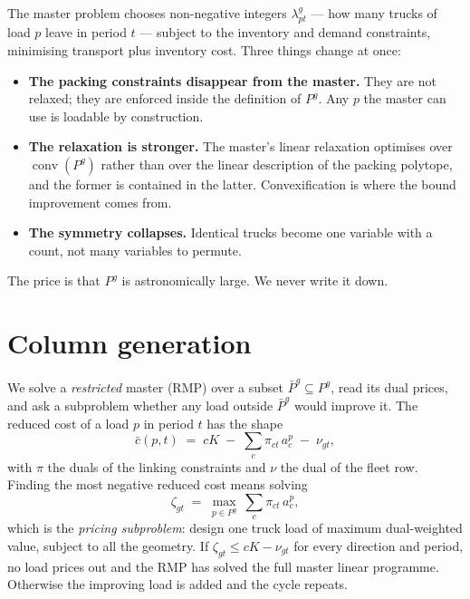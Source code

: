 \documentclass[11pt,a4paper]{article}
\newcommand{\conv}{\operatorname{conv}}
\begin{document}
The master problem chooses non-negative integers $\lambda^{g}_{pt}$ --- how many
trucks of load $p$ leave in period $t$ --- subject to the inventory and demand
constraints, minimising transport plus inventory cost. Three things change at
once:

\begin{itemize}[leftmargin=1.4em]
\item \textbf{The packing constraints disappear from the master.} They are not
relaxed; they are enforced inside the definition of $P^{g}$. Any $p$ the master
can use is loadable by construction.
\item \textbf{The relaxation is stronger.} The master's linear relaxation
optimises over $\conv(P^{g})$ rather than over the linear description of the
packing polytope, and the former is contained in the latter. Convexification is
where the bound improvement comes from.
\item \textbf{The symmetry collapses.} Identical trucks become one variable with
a count, not many variables to permute.
\end{itemize}

The price is that $P^{g}$ is astronomically large. We never write it down.

\section{Column generation}

We solve a \emph{restricted} master (RMP) over a subset
$\bar P^{g}\subseteq P^{g}$, read its dual prices, and ask a subproblem whether
any load outside $\bar P^{g}$ would improve it. The reduced cost of a load $p$
in period $t$ has the shape
\[
  \bar c(p,t) \;=\; cK \;-\; \sum_{c}\pi_{ct}\,a^{p}_{c} \;-\; \nu_{gt},
\]
with $\pi$ the duals of the linking constraints and $\nu$ the dual of the fleet
row. Finding the most negative reduced cost means solving
\[
  \zeta_{gt}\;=\;\max_{p\in P^{g}}\ \sum_{c}\pi_{ct}\,a^{p}_{c},
\]
which is the \emph{pricing subproblem}: design one truck load of maximum
dual-weighted value, subject to all the geometry. If $\zeta_{gt}\le cK-\nu_{gt}$
for every direction and period, no load prices out and the RMP has solved the
full master linear programme. Otherwise the improving load is added and the
cycle repeats.
\end{document}
